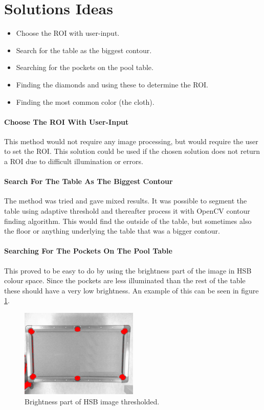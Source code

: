 \section{Solutions Ideas}

\begin{itemize}
\setlength{\itemsep}{0mm}
	\item Choose the ROI with user-input.
	\item Search for the table as the biggest contour.
	\item Searching for the pockets on the pool table.
	\item Finding the diamonds and using these to determine the ROI.
	\item Finding the most common color (the cloth).
\end{itemize}

\paragraph{Choose The ROI With User-Input}
This method would not require any image processing, but would require the user to set the ROI. This solution could be used if the chosen solution does not return a ROI due to difficult illumination or errors.

\paragraph{Search For The Table As The Biggest Contour}
The method was tried and gave mixed results. It was possible to segment the table using adaptive threshold and thereafter process it with OpenCV  contour finding algorithm. This would find the outside of the table, but sometimes also the floor or anything underlying the table that was a bigger contour.

\paragraph{Searching For The Pockets On The Pool Table}
This proved to be easy to do by using the brightness part of the image in HSB colour space. Since the pockets are less illuminated than the rest of the table these should have a very low brightness. An example of this can be seen in figure \ref{fig:value_thres}.

\begin{figure}[htpb]
\begin{center}
\leavevmode
\includegraphics[width=0.5\textwidth]{images/value_thres}
\end{center}
\caption{Brightness part of HSB image thresholded.}
\label{fig:value_thres}
\end{figure}


